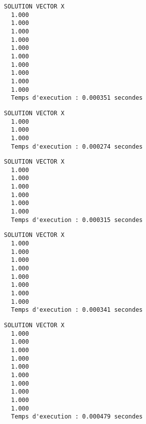 \begin{lstlisting}[caption={$A_8X=B$} results, basicstyle=\fontsize{5}{8}\selectfont]
                  SOLUTION VECTOR X 
  1.000   
  1.000   
  1.000   
  1.000   
  1.000   
  1.000   
  1.000   
  1.000   
  1.000   
  1.000   
  Temps d'execution : 0.000351 secondes
\end{lstlisting}

\begin{lstlisting}[caption={$A_9X=B$} results, basicstyle=\fontsize{8}{10}\selectfont]
                  SOLUTION VECTOR X 
  1.000   
  1.000   
  1.000   
  Temps d'execution : 0.000274 secondes
\end{lstlisting}

\begin{lstlisting}[caption={$A_10X=B$} results, basicstyle=\fontsize{8}{10}\selectfont]
                  SOLUTION VECTOR X 
  1.000   
  1.000   
  1.000   
  1.000   
  1.000   
  1.000   
  Temps d'execution : 0.000315 secondes
\end{lstlisting}

\begin{lstlisting}[caption={$A_11X=B$} results, basicstyle=\fontsize{5}{8}\selectfont]
                  SOLUTION VECTOR X 
  1.000   
  1.000   
  1.000   
  1.000   
  1.000   
  1.000   
  1.000   
  1.000   
  Temps d'execution : 0.000341 secondes
\end{lstlisting}

\begin{lstlisting}[caption={$A_12X=B$} results, basicstyle=\fontsize{5}{8}\selectfont]
                  SOLUTION VECTOR X 
  1.000   
  1.000   
  1.000   
  1.000   
  1.000   
  1.000   
  1.000   
  1.000   
  1.000   
  1.000   
  Temps d'execution : 0.000479 secondes
\end{lstlisting}
% 

